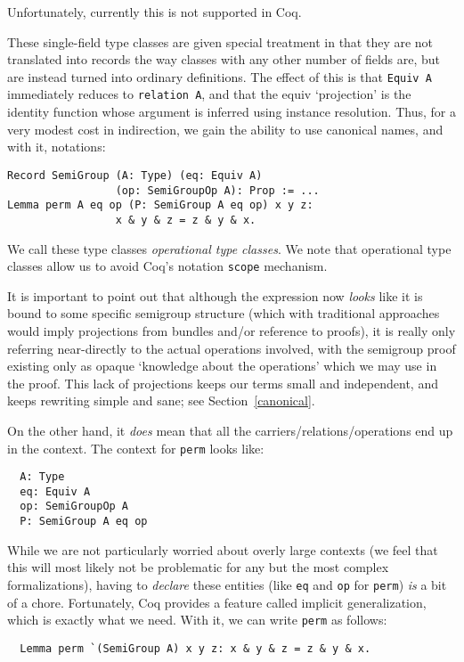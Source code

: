\documentclass[a4paper,10pt,runningheads]{llncs}
\begin{document}
Unfortunately, currently this is not supported in Coq.

These single-field type classes are given special treatment in that they are not translated into
records the way classes with any other number of fields are, but are instead turned into ordinary
definitions. The effect of this is that \lstinline|Equiv A| immediately reduces to \lstinline|relation A|, and that the equiv `projection' is the identity function whose argument is inferred using instance resolution. Thus, for a very modest cost in indirection, we gain the ability to use canonical names, and with it, notations:
\begin{lstlisting}
Record SemiGroup (A: Type) (eq: Equiv A)
                 (op: SemiGroupOp A): Prop := ...
Lemma perm A eq op (P: SemiGroup A eq op) x y z:
                 x & y & z = z & y & x.
\end{lstlisting}

We call these type classes \emph{operational type classes}. We note that operational type classes
allow us to avoid Coq's notation \lstinline|scope| mechanism.

It is important to point out that although the expression now \emph{looks} like it is bound to some
specific semigroup structure (which with traditional approaches would imply projections from bundles
and/or reference to proofs), it is really only referring near-directly to the actual operations
involved, with the semigroup proof existing only as opaque `knowledge about the operations' which we
may use in the proof. This lack of projections keeps our terms small and independent, and keeps
rewriting simple and sane; see Section~\ref{canonical}.

On the other hand, it \emph{does} mean that all the carriers/relations/operations end up in the
context. The context for \lstinline|perm| looks like:
\begin{lstlisting}
  A: Type
  eq: Equiv A
  op: SemiGroupOp A
  P: SemiGroup A eq op
\end{lstlisting}


While we are not particularly worried about overly large contexts (we feel that this will most
likely not be problematic for any but the most complex formalizations), having to \emph{declare}
these entities (like \lstinline|eq| and \lstinline|op| for \lstinline|perm|) \emph{is} a bit of a chore. Fortunately, Coq provides a feature called implicit generalization, which is exactly what we need.
With it, we can write \lstinline|perm| as follows:
\begin{lstlisting}
  Lemma perm `(SemiGroup A) x y z: x & y & z = z & y & x.
\end{lstlisting}
\end{document}
